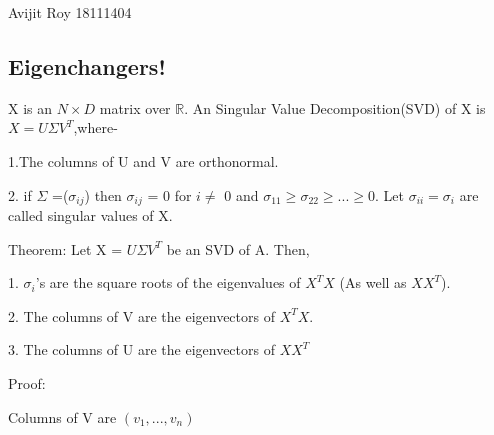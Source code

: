 \documentclass[a4paper,11pt]{article}
\begin{document}
{Avijit Roy}   %
{18111404}	%

\begin{mlsolution}

\section{Eigenchangers!}
X is an $N \times D$ matrix over $\mathbb{R}$. An Singular Value Decomposition(SVD) of X is $X = U \Sigma V^T$,where-

1.The columns of U and V are orthonormal.

2. if $\Sigma$ =($\sigma_{ij}$) then $\sigma_{ij}$ = 0 for $i\neq$ 0 and $\sigma_{11} \geq \sigma_{22} \geq ... \geq 0$. Let $\sigma_{ii} = \sigma_i$ are called singular values of X.

\color{blue} Theorem: \color{black}Let X = $U \Sigma V^T$ be an SVD of A. Then,

1. $\sigma_i$'s are the square roots of the eigenvalues of $X^TX$ (As well as $XX^T$).

2. The columns of V are the eigenvectors of $X^TX$. 

3. The columns of U are the eigenvectors of $XX^T$

\color{blue} Proof: 

\color{black}Columns of V are $(v_1,...,v_n)$


\end{mlsolution}
\end{document}
